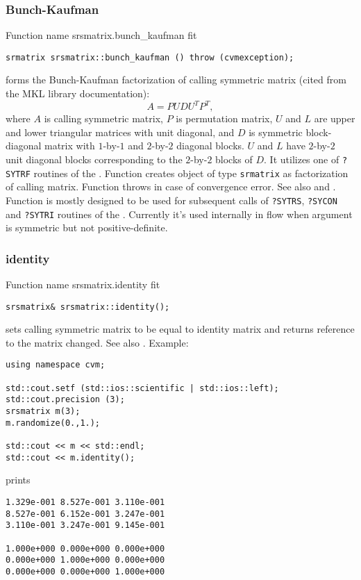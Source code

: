 \subsubsection{Bunch-Kaufman}
Function%
\pdfdest name {srsmatrix.bunch_kaufman} fit
\begin{verbatim}
srmatrix srsmatrix::bunch_kaufman () throw (cvmexception);
\end{verbatim}
forms the Bunch-Kaufman factorization of  calling symmetric matrix 
(cited from the MKL library documentation):
\begin{equation*}
A=PUDU^TP^T,
\end{equation*}
where $A$ is calling symmetric matrix,
$P$ is  permutation matrix, $U$ and $L$ are upper and lower triangular
matrices with unit diagonal, and $D$ is  symmetric 
block-diagonal matrix with $1$-by-$1$ and $2$-by-$2$
diagonal blocks. $U$ and $L$ have $2$-by-$2$ unit diagonal 
blocks corresponding to the $2$-by-$2$ blocks of $D$.
It utilizes one of \verb"?SYTRF" routines of the
.
Function
creates  object of type \verb"srmatrix" as 
 factorization of  calling matrix.
Function throws 
in case of convergence error.
See also
 and
.
Function is mostly designed to be used for subsequent calls
of \verb"?SYTRS", \verb"?SYCON" and \verb"?SYTRI" routines of the
.
Currently it's used internally in  flow
when argument is symmetric but not positive-definite.
\newpage





\subsubsection{identity}
Function%
\pdfdest name {srsmatrix.identity} fit
\begin{verbatim}
srsmatrix& srsmatrix::identity();
\end{verbatim}
sets  calling symmetric matrix to be equal to identity matrix
and returns  reference to
the matrix changed. 
See also .
Example:
\begin{Verbatim}
using namespace cvm;

std::cout.setf (std::ios::scientific | std::ios::left); 
std::cout.precision (3);
srsmatrix m(3);
m.randomize(0.,1.);

std::cout << m << std::endl;
std::cout << m.identity();
\end{Verbatim}
prints
\begin{Verbatim}
1.329e-001 8.527e-001 3.110e-001
8.527e-001 6.152e-001 3.247e-001
3.110e-001 3.247e-001 9.145e-001

1.000e+000 0.000e+000 0.000e+000
0.000e+000 1.000e+000 0.000e+000
0.000e+000 0.000e+000 1.000e+000
\end{Verbatim}
\newpage



